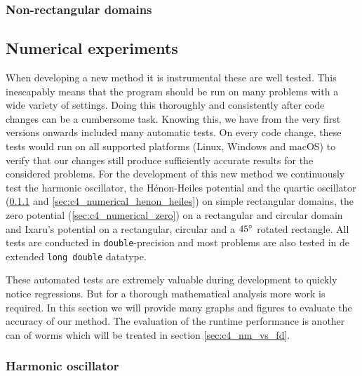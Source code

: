 


\subsubsection{Non-rectangular domains}


\subsection{Numerical experiments}

When developing a new method it is instrumental these are well tested. This inescapably means that the program should be run on many problems with a wide variety of settings. Doing this thoroughly and consistently after code changes can be a cumbersome task. Knowing this, we have from the very first versions onwards included many automatic tests. On every code change, these tests would run on all supported platforms (Linux, Windows and macOS) to verify that our changes still produce sufficiently accurate results for the considered problems. For the development of this new method we continuously test the harmonic oscillator, the Hénon-Heiles potential and the quartic oscillator (\ref{sec:c4_numerical_harmonic} and \ref{sec:c4_numerical_henon_heiles}) on simple rectangular domains, the zero potential (\ref{sec:c4_numerical_zero}) on a rectangular and circular domain and Ixaru's potential on a rectangular, circular and a $45\degree$ rotated rectangle. All tests are conducted in \texttt{double}-precision and most problems are also tested in de extended \texttt{long double} datatype.

These automated tests are extremely valuable during development to quickly notice regressions. But for a thorough mathematical analysis more work is required. In this section we will provide many graphs and figures to evaluate the accuracy of our method. The evaluation of the runtime performance is another can of worms which will be treated in section \ref{sec:c4_nm_vs_fd}.

\subsubsection{Harmonic oscillator}\label{sec:c4_numerical_harmonic}


